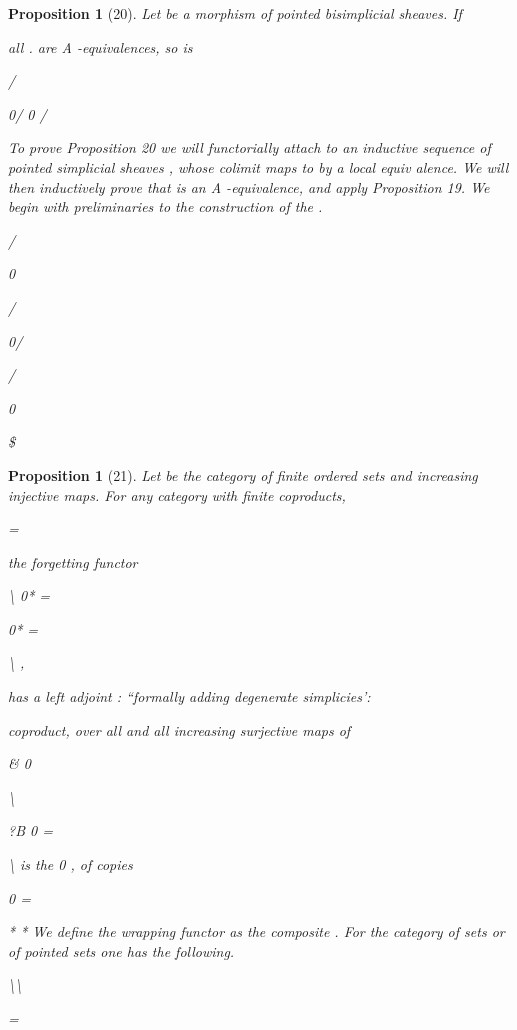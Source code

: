 \documentclass[11pt,a4paper]{article}
\theoremstyle{plain}
\newtheorem{proposition}[theorem]{Proposition}
\theoremstyle{definition}
\begin{document}
\begin{proposition}[20]
Let
be a morphism of pointed bisimplicial sheaves. If

all 
.
 are A -equivalences, so is

/

0/  0 
/

To prove Proposition 20 we will functorially attach to
an inductive sequence
of pointed simplicial sheaves  , whose colimit maps to
by a local equiv
alence. We will then inductively prove that 
is an A -equivalence, and
apply Proposition 19. We begin with preliminaries to the construction of the  .

/

0

/

0/ 

/

0

  \$

\end{proposition}

\begin{proposition}[21]
Let   be the category of finite ordered sets 
and increasing injective maps. For any category
with finite coproducts,

=



the forgetting functor

\textbackslash{} 0* =

0* =

\textbackslash{}
,

has a left adjoint  : ``formally adding degenerate simplicies':

coproduct, over all and all increasing surjective maps
of 



\& 0

\textbackslash{} 



?B 0 =

\textbackslash{}   is the
0 , of copies



0 =

*
*
We define the wrapping functor
as the composite
 . For the category of sets or of pointed sets one has the following.

\textbackslash{}\textbackslash{}

=

\end{proposition}
\end{document}
